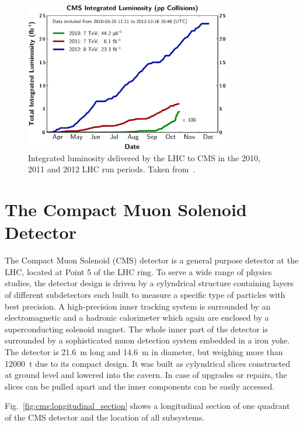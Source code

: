 \begin{figure}[h!tp]
    \centering
    \includegraphics[width=0.8\textwidth]{figures/cms_detector/lumi_integrated.pdf}
    \caption[Integrated luminosity delivered to CMS]{Integrated luminosity
        delivered by the LHC to CMS in the 2010, 2011 and 2012 LHC run periods.
        Taken from~\cite{Berger:2014aca}.}
    \label{fig:cms:lumi_integrated}
\end{figure}


\section{The Compact Muon Solenoid Detector}

The Compact Muon Solenoid (CMS) detector is a general purpose detector at the
LHC, located at Point 5 of the LHC ring. To serve a wide range of physics
studies, the detector design is driven by a cylyndrical structure containing
layers of different subdetectors each built to measure a specific type of
particles with best precision. A high-precision inner tracking system is
surrounded by an electromagnetic and a hadronic calorimeter which again are
enclosed by a superconducting solenoid magnet. The whole inner part of the
detector is surrounded by a sophisticated muon detection system embedded in a
iron yoke. The detector is \SI{21.6}{\meter} long and \SI{14.6}{\meter} in
diameter, but weighing more than \SI{12000}{\tonne} due to its compact design.
It was built as cylyndrical slices constructed at ground level and lowered into
the cavern. In case of upgrades or repairs, the slices can be pulled apart and
the inner components can be easily accessed.

Fig.~\ref{fig:cms:longitudinal_section} shows a longitudinal section of one
quadrant of the CMS detector and the location of all subsystems.

